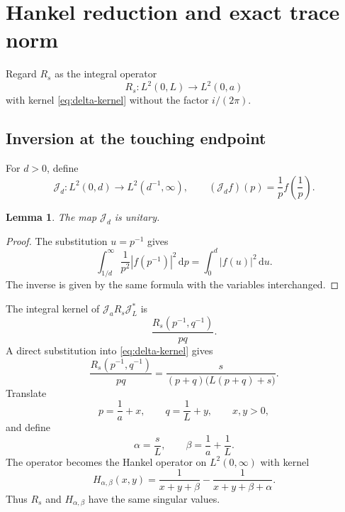 \documentclass[11pt]{article}
\theoremstyle{accent}
\newtheorem{lemma}[theorem]{Lemma}
\theoremstyle{definition}
\newcommand{\dd}{\,\mathrm{d}}
\newcommand{\abs}[1]{\left|#1\right|}
\begin{document}
\section{Hankel reduction and exact trace norm}

Regard \(R_s\) as the integral operator
\[
 R_s:L^2(0,L)\longrightarrow L^2(0,a)
\]
with kernel \eqref{eq:delta-kernel} without the factor \(i/(2\pi)\).

\subsection{Inversion at the touching endpoint}

For \(d>0\), define
\begin{equation}\label{eq:J-d}
 \mathcal J_d:L^2(0,d)\longrightarrow L^2(d^{-1},\infty),
 \qquad
 (\mathcal J_df)(p)=\frac1p f\!\left(\frac1p\right).
\end{equation}

\begin{lemma}\label{lem:J-unitary}
The map \(\mathcal J_d\) is unitary.
\end{lemma}

\begin{proof}
The substitution \(u=p^{-1}\) gives
\[
 \int_{1/d}^{\infty}\frac1{p^2}
 \abs{f(p^{-1})}^2\dd p
 =\int_0^d\abs{f(u)}^2\dd u.
\]
The inverse is given by the same formula with the variables interchanged.
\end{proof}

The integral kernel of \(\mathcal J_aR_s\mathcal J_L^*\) is
\begin{equation}\label{eq:inverted-kernel-start}
 \frac{R_s(p^{-1},q^{-1})}{pq}.
\end{equation}
A direct substitution into \eqref{eq:delta-kernel} gives
\begin{equation}\label{eq:inverted-kernel}
 \boxed{
 \frac{R_s(p^{-1},q^{-1})}{pq}
 =\frac{s}{(p+q)\bigl(L(p+q)+s\bigr)}.
 }
\end{equation}
Translate
\[
 p=\frac1a+x,\qquad q=\frac1L+y,
 \qquad x,y>0,
\]
and define
\begin{equation}\label{eq:alpha-beta}
 \alpha=\frac{s}{L},
 \qquad
 \beta=\frac1a+\frac1L.
\end{equation}
The operator becomes the Hankel operator on \(L^2(0,\infty)\) with kernel
\begin{equation}\label{eq:H-kernel}
 \boxed{
 H_{\alpha,\beta}(x,y)
 =\frac1{x+y+\beta}
 -\frac1{x+y+\beta+\alpha}.
 }
\end{equation}
Thus \(R_s\) and \(H_{\alpha,\beta}\) have the same singular values.
\end{document}
